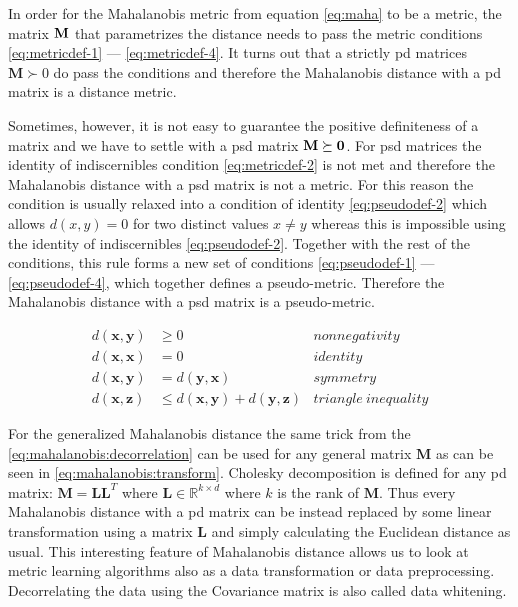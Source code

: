 \documentclass[12pt,a4paper]{report}
\begin{document}
In order for the Mahalanobis metric from equation \eqref{eq:maha} to be a metric, the matrix $\bf{M}$ that parametrizes the distance needs to pass the metric conditions \ref{eq:metricdef-1} --- \ref{eq:metricdef-4}. It turns out that a strictly \ac{pd} matrices $\bm{M} \succ 0$ do pass the conditions and therefore the Mahalanobis distance with a \ac{pd} matrix is a distance metric.

Sometimes, however, it is not easy to guarantee the positive definiteness of a matrix and we have to settle with a \ac{psd} matrix $\bf{M} \succeq 0$. For \ac{psd} matrices the identity of indiscernibles condition \ref{eq:metricdef-2} is not met and therefore the Mahalanobis distance with a \ac{psd} matrix is not a metric. For this reason the condition is usually relaxed into a condition of identity \ref{eq:pseudodef-2} which allows $d(x,y)=0$ for two distinct values $x \neq y$ whereas this is impossible using the identity of indiscernibles \ref{eq:pseudodef-2}. Together with the rest of the conditions, this rule forms a new set of conditions \ref{eq:pseudodef-1} ---\ref{eq:pseudodef-4}, which together defines a pseudo-metric. Therefore the Mahalanobis distance with a \ac{psd} matrix is a pseudo-metric.

\begin{align}
d(\textbf{x},\textbf{y}) &\geq 0 & nonnegativity \label{eq:pseudodef-1} \\
d(\textbf{x},\textbf{x}) &= 0 & identity \label{eq:pseudodef-2} \\
d(\textbf{x},\textbf{y}) &= d(\textbf{y},\textbf{x}) & symmetry \label{eq:pseudodef-3} \\
d(\textbf{x},\textbf{z}) &\leq d(\textbf{x},\textbf{y}) + d(\textbf{y},\textbf{z}) & triangle \ inequality \label{eq:pseudodef-4}
\end{align} 

For the generalized Mahalanobis distance the same trick from the \ref{eq:mahalanobis:decorrelation} can be used for any general matrix $\bm{M}$ as can be seen in \ref{eq:mahalanobis:transform}. Cholesky decomposition is defined for any \ac{pd} matrix: $\bm{M}=\bm{L}\bm{L}^T$ where $\bm{L} \in \mathbb{R}^{k \times d}$ where $k$ is the rank of $\bm{M}$. Thus every Mahalanobis distance with a \ac{pd} matrix can be instead replaced by some linear transformation using a matrix $\bm{L}$ and simply calculating the Euclidean distance as usual. This interesting feature of Mahalanobis distance allows us to look at metric learning algorithms also as a data transformation or data preprocessing. Decorrelating the data using the Covariance matrix is also called data whitening.
\end{document}
